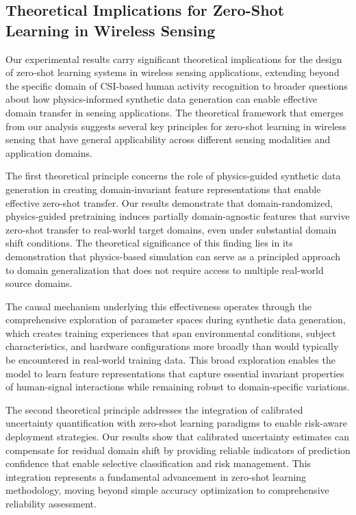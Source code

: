 \documentclass[journal]{IEEEtran}
\begin{document}
\subsection{Theoretical Implications for Zero-Shot Learning in Wireless Sensing}

Our experimental results carry significant theoretical implications for the design of zero-shot learning systems in wireless sensing applications, extending beyond the specific domain of CSI-based human activity recognition to broader questions about how physics-informed synthetic data generation can enable effective domain transfer in sensing applications. The theoretical framework that emerges from our analysis suggests several key principles for zero-shot learning in wireless sensing that have general applicability across different sensing modalities and application domains.

The first theoretical principle concerns the role of physics-guided synthetic data generation in creating domain-invariant feature representations that enable effective zero-shot transfer. Our results demonstrate that domain-randomized, physics-guided pretraining induces partially domain-agnostic features that survive zero-shot transfer to real-world target domains, even under substantial domain shift conditions. The theoretical significance of this finding lies in its demonstration that physics-based simulation can serve as a principled approach to domain generalization that does not require access to multiple real-world source domains.

The causal mechanism underlying this effectiveness operates through the comprehensive exploration of parameter spaces during synthetic data generation, which creates training experiences that span environmental conditions, subject characteristics, and hardware configurations more broadly than would typically be encountered in real-world training data. This broad exploration enables the model to learn feature representations that capture essential invariant properties of human-signal interactions while remaining robust to domain-specific variations.

The second theoretical principle addresses the integration of calibrated uncertainty quantification with zero-shot learning paradigms to enable risk-aware deployment strategies. Our results show that calibrated uncertainty estimates can compensate for residual domain shift by providing reliable indicators of prediction confidence that enable selective classification and risk management. This integration represents a fundamental advancement in zero-shot learning methodology, moving beyond simple accuracy optimization to comprehensive reliability assessment.
\end{document}
